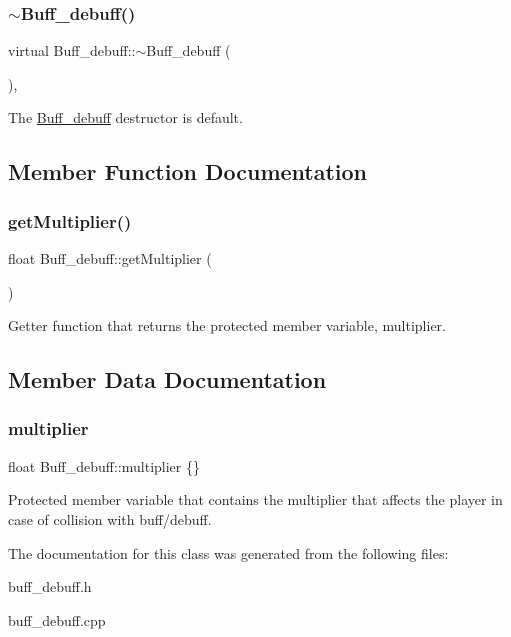 \subsubsection{\texorpdfstring{$\sim$\+Buff\+\_\+debuff()}{~Buff\_debuff()}}
{\footnotesize\ttfamily virtual Buff\+\_\+debuff\+::$\sim$\+Buff\+\_\+debuff (\begin{DoxyParamCaption}{ }\end{DoxyParamCaption})\hspace{0.3cm}{\ttfamily [virtual]}, {\ttfamily [default]}}

The \hyperlink{classBuff__debuff}{Buff\+\_\+debuff} destructor is default. 

\subsection{Member Function Documentation}
\mbox{\label{classBuff__debuff_ad72e20ee3b29b7ba11d36aa05a24f838}} 
\subsubsection{\texorpdfstring{get\+Multiplier()}{getMultiplier()}}
{\footnotesize\ttfamily float Buff\+\_\+debuff\+::get\+Multiplier (\begin{DoxyParamCaption}{ }\end{DoxyParamCaption})}

Getter function that returns the protected member variable, multiplier. 

\subsection{Member Data Documentation}
\mbox{\label{classBuff__debuff_a0be49a0b6f19cb7cc160edad75109187}} 
\subsubsection{\texorpdfstring{multiplier}{multiplier}}
{\footnotesize\ttfamily float Buff\+\_\+debuff\+::multiplier \{\}\hspace{0.3cm}{\ttfamily [protected]}}

Protected member variable that contains the multiplier that affects the player in case of collision with buff/debuff. 

The documentation for this class was generated from the following files\+:\begin{DoxyCompactItemize}
\item 
buff\+\_\+debuff.\+h\item 
buff\+\_\+debuff.\+cpp\end{DoxyCompactItemize}
